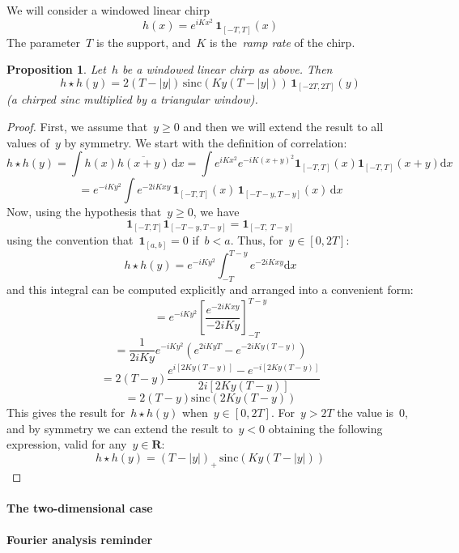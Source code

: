 \documentclass[a4paper]{article}      %
\newtheorem{proposition}[theorem]{Proposition}
\newcommand{\1}{\mathbf{1}}
\newcommand{\R}{\mathbf{R}}
\newcommand{\ud}{\mathrm{d}}
\newcommand{\abs}[1]{\left|#1\right|}
\newcommand{\paren}[1]{\left(#1\right)}
\begin{document}
We will consider a windowed linear chirp
$$
h(x)
=
e^{iKx^2}
\,
\1_{[-T,T]}(x)
$$
The parameter~$T$ is the support, and~$K$ is the~\emph{ramp rate}
of the chirp.

\begin{proposition}
	Let~$h$ be a windowed linear chirp as above.  Then
	\[
		h\star h(y)=
		2\paren{T-\abs{y}}
		\,
		\mathrm{sinc}\paren{ Ky\paren{T-\abs{y}} }
		\,
		\1_{[-2T,2T]}(y)
	\]
	(a chirped sinc multiplied by a triangular window).
\end{proposition}

\begin{proof}
	First, we assume that~$y\ge0$ and then we will extend the result to all
	values of~$y$ by symmetry.  We start with the definition of correlation:
	\[
		h\star h (y)
		=
		\int
		h(x)\overline{h(x+y)}\,\ud x
		=
		\int
		e^{iKx^2}
		e^{-iK\paren{x+y}^2}
		\1_{[-T,T]} (x)
		\1_{[-T,T]} (x+y)
		\ud x
	\]
	\[
		=
		e^{-iKy^2}
		\int
		e^{-2iKxy}
		\,
		\1_{[-T,T]} (x)
		\,
		\1_{[-T-y,T-y]} (x)
		\,
		\ud x
	\]
	Now, using the hypothesis that~$y\ge0$, we have
	\[
		\1_{[-T,T]} \1_{[-T-y,T-y]}
		=
		\1_{[-T,\ T-y]}
	\]
	using the convention that~$\1_{[a,b]}=0$ if~$b<a$.
	Thus, for~$y\in[0,2T]$:
	\[
		h\star h (y)
		=
		e^{-iKy^2}
		\int_{-T}^{T-y}
		e^{-2iKxy}
		\ud x
	\]
	and this integral can be computed explicitly and arranged into a convenient
	form:
	\[
		=
		e^{-iKy^2}
		\left[
			\frac{\displaystyle e^{-2iKxy}}{-2iKy}
		\right]_{-T}^{T-y}
	\]
	\[
		=
		\frac{1}{2iKy}
		e^{-iKy^2}
		\paren{
			e^{2iKyT}-e^{-2iKy(T-y)}
		}
	\]
	\[
		=
		2\paren{T-y}
		\frac{
			e^{i\left[2Ky\paren{T-y}\right]}-e^{-i\left[2Ky\paren{T-y}\right]}
			}{
				2i\left[2Ky\paren{T-y}\right]
		}
	\]
	\[
		=
		2\paren{T-y}\mathrm{sinc}\paren{2Ky\paren{T-y}}
	\]
	This gives the result for~$h\star h(y)$ when~$y\in[0,2T]$.  For~$y>2T$ the
	value is~$0$, and by symmetry we can extend the result to~$y<0$ obtaining
	the following expression, valid for any~$y\in\R$:
	\[
		h\star h(y)=\paren{T-\abs{y}}_+
		\,
		\mathrm{sinc}\paren{ Ky\paren{T-\abs{y}} }
	\]
\end{proof}


\paragraph{The two-dimensional case}

\clearpage
\paragraph{Fourier analysis reminder}
\end{document}
